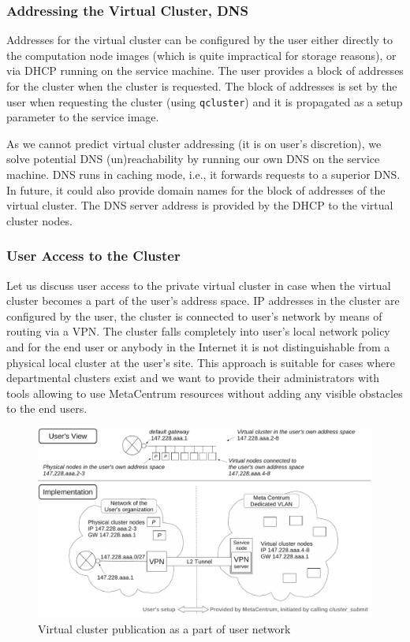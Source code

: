\documentclass[a4paper]{article}
\begin{document}
\subsubsection{Addressing the Virtual Cluster, DNS}

Addresses for the virtual cluster can be configured by the user either
directly to the computation node images (which is quite impractical for
storage reasons), or via DHCP running on the service machine. The user
provides a block of addresses for the cluster when the cluster is
requested. The block of addresses is set by the user when requesting the
cluster (using \texttt{qcluster}) and it is propagated as a setup parameter to
the service image. 

As we cannot predict virtual cluster addressing (it is on user's
discretion), we solve potential
DNS (un)reachability by running our own DNS on the service machine. DNS runs in
caching mode, i.e., it forwards requests to a superior DNS. In future, it
could also provide domain names for the block of addresses of the virtual
cluster. The DNS server address is provided by the DHCP to the virtual
cluster nodes.

\subsubsection{User Access to the Cluster}

Let us discuss user access to the private virtual cluster
in case when the virtual cluster becomes a part of the
user's address space. IP addresses in the cluster
are configured by the user, the cluster is
connected to user's network by means of routing via a VPN.
The cluster falls completely into user's local network
policy and for the end user or anybody in the Internet it is not
distinguishable from a physical local cluster at the user's site. This approach is suitable
for cases where departmental clusters exist
and we want to provide their administrators with tools allowing to use
MetaCentrum resources without adding any visible obstacles to the end users.

\begin{figure}[htb]
    \includegraphics[width=\columnwidth]{publ.pdf}
    \caption{Virtual cluster publication as a part of user network}
    \label{fig:publication}
\end{figure}
\end{document}
